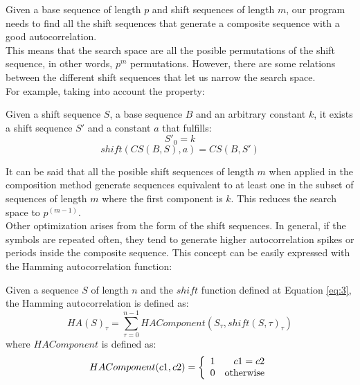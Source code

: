   Given a base sequence of length $p$ and  shift sequences of length $m$,
  our program needs to find all the shift sequences that generate a composite
  sequence with a good autocorrelation.\\

  This means that the search space are all the posible permutations of the
  shift sequence, in other words, $p^m$ permutations. However, there are some
  relations between the different shift sequences that let us narrow the
  search space.\\

  For example, taking into account the property:

  \begin{property}
    Given a shift sequence $S$, a base sequence $B$ and an arbitrary constant
    $k$, it exists a shift sequence $S'$ and a constant $a$ that fulfills:
        \begin{equation}
          S'_{0} = k
        \end{equation}
        \begin{equation}
          shift(CS(B, S), a) = CS(B, S')
        \end{equation}
  \end{property}

  It can be said that all the posible shift sequences of length $m$ when
  applied in the composition method generate sequences equivalent to at least
  one in the subset of sequences of length $m$ where the first component is $k$.
  This reduces the search space to $p^{(m-1)}$.\\

  Other optimization arises from the form of the shift sequences. In general,
  if the symbols are repeated often, they tend to generate higher
  autocorrelation spikes or periods inside the composite sequence. This
  concept can be easily expressed with the Hamming autocorrelation function:\\

  \begin{definition}
    Given a sequence $S$ of length $n$ and the  $shift$ function  defined at
    Equation \eqref{eq:3}, the Hamming autocorrelation is defined as:
      \begin{equation} \label{hamming:eq:1}
        HA(S)_{\tau} = \sum_{\tau = 0}^{n-1} HAComponent(S_{\tau}, shift(S, \tau)_{\tau})
      \end{equation}
    where $HAComponent$ is defined as:
      \begin{equation}
        HAComponent(c1, c2) = \left\{\begin{array}{lr}
            1  &  c1 = c2\\
            0  & \textnormal{otherwise} \\
        \end{array}\right.
      \end{equation}
  \end{definition}

